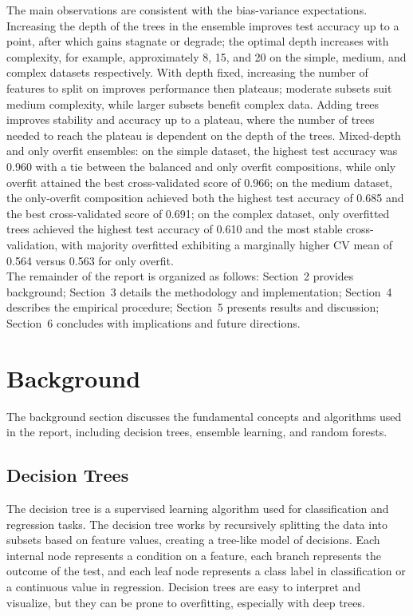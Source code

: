 \documentclass[conference]{IEEEtran}
\begin{document}
The main observations are consistent with the bias-variance expectations. Increasing the depth of the trees in the ensemble improves test accuracy up to a point, after which gains stagnate or degrade; the optimal depth increases with complexity, for example, approximately 8, 15, and 20 on the simple, medium, and complex datasets respectively. With depth fixed, increasing the number of features to split on improves performance then plateaus; moderate subsets suit medium complexity, while larger subsets benefit complex data. Adding trees improves stability and accuracy up to a plateau, where the number of trees needed to reach the plateau is dependent on the depth of the trees. Mixed-depth and only overfit ensembles: on the simple dataset, the highest test accuracy was 0.960 with a tie between the balanced and only overfit compositions, while only overfit attained the best cross-validated score of 0.966; on the medium dataset, the only-overfit composition achieved both the highest test accuracy of 0.685 and the best cross-validated score of 0.691; on the complex dataset, only overfitted trees achieved the highest test accuracy of 0.610 and the most stable cross-validation, with majority overfitted exhibiting a marginally higher CV mean of 0.564 versus 0.563 for only overfit.\\

The remainder of the report is organized as follows: Section~2 provides background; Section~3 details the methodology and implementation; Section~4 describes the empirical procedure; Section~5 presents results and discussion; Section~6 concludes with implications and future directions.

\section{Background}
The background section discusses the fundamental concepts and algorithms used in the report, including decision trees, ensemble learning, and 
random forests.

\subsection{Decision Trees}
The decision tree is a supervised learning algorithm used for classification and regression tasks. The decision tree works by recursively 
splitting the data into subsets based on feature values, creating a tree-like model of decisions. Each internal node represents a condition on a 
feature, each branch represents the outcome of the test, and each leaf node represents a class label in classification or a continuous value 
in regression. Decision trees are easy to interpret and visualize, but they can be prone to overfitting, especially with deep trees.
\end{document}
